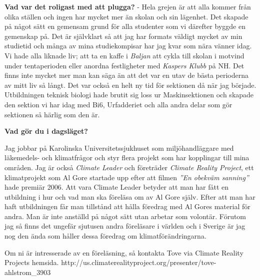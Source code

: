 \textbf{Vad var det roligast med att plugga?}
 - Hela grejen är att alla kommer från olika ställen och ingen har mycket mer än 
skolan och sin lägenhet. Det skapade på något sätt en gemensam grund för alla 
studenter som vi därefter byggde en gemenskap på. Det är självklart så att 
jag har formats väldigt mycket av min studietid och många av mina 
studiekompisar har jag kvar som nära vänner idag. Vi hade alla liknade liv; 
att ta en kaffe i \emph{Baljan} att cykla till skolan i motvind under tentaperioden 
eller anordna festligheter med \emph{Kaspers Klubb} på NH. Det finns inte mycket mer 
man kan säga än att det var en utav de bästa perioderna av mitt liv så långt. 
Det var också en helt ny tid för sektionen då när jag började. Utbildningen 
teknisk biologi hade brutit sig loss ur Maskinsektionen och skapade den 
sektion vi har idag med Bi6, Urfadderiet och alla andra delar som gör 
sektionen så härlig som den är.  



\textbf{Vad gör du i dagsläget?}

Jag jobbar på Karolinska Universitetssjukhuset som miljöhandläggare med 
läkemedels- och klimatfrågor och styr flera projekt som har kopplingar till 
mina områden. Jag är också \emph{Climate Leader} och företräder \emph{Climate Reality 
Project}, ett klimatprojekt som Al Gore startade upp efter att filmen \emph{''En 
obekväm sanning''} hade premiär 2006. Att vara Climate Leader betyder att 
man har fått en utbildning i hur och vad man ska föreläsa om av Al Gore 
själv. Efter att man har haft utbildningen får man tillstånd att hålla 
föredrag med Al Gores material för andra. Man är inte anställd på något sätt 
utan arbetar som volontär. Förutom jag så finns det ungefär sjutusen andra 
föreläsare i världen och i Sverige är jag nog den ända som håller dessa 
föredrag om klimatförändringarna. 

Om ni är intresserade av en föreläsning, så kontakta Tove via Climate Reality 
Projects hemsida. http://us.climaterealityproject.org/presenter/tove-
ahlstrom_3903

